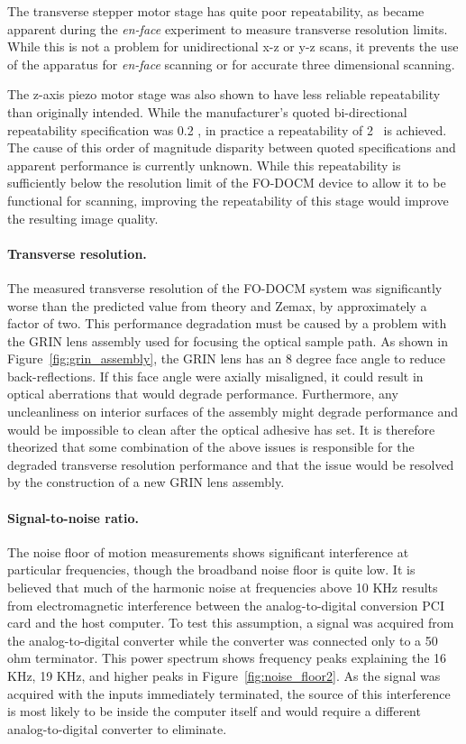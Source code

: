 The transverse stepper motor stage has quite poor repeatability, as became apparent during the {\em en-face} experiment to measure transverse resolution limits. While this is not a problem for unidirectional x-z or y-z scans, it prevents the use of the apparatus for {\em en-face} scanning or for accurate three dimensional scanning.

The z-axis piezo motor stage was also shown to have less reliable repeatability than originally intended. While the manufacturer's quoted bi-directional repeatability specification was 0.2 \micron, in practice a repeatability of 2 \micron~is achieved. The cause of this order of magnitude disparity between quoted specifications and apparent performance is currently unknown. While this repeatability is sufficiently below the resolution limit of the FO-DOCM device to allow it to be functional for scanning, improving the repeatability of this stage would improve the resulting image quality.

\paragraph{Transverse resolution.}

The measured transverse resolution of the FO-DOCM system was significantly worse than the predicted value from theory and Zemax, by approximately a factor of two. This performance degradation must be caused by a problem with the GRIN lens assembly used for focusing the optical sample path. As shown in Figure~\ref{fig:grin_assembly}, the GRIN lens has an 8 degree face angle to reduce back-reflections. If this face angle were axially misaligned, it could result in optical aberrations that would degrade performance. Furthermore, any uncleanliness on interior surfaces of the assembly might degrade performance and would be impossible to clean after the optical adhesive has set. It is therefore theorized that some combination of the above issues is responsible for the degraded transverse resolution performance and that the issue would be resolved by the construction of a new GRIN lens assembly.

\paragraph{Signal-to-noise ratio.}

The noise floor of motion measurements shows significant interference at particular frequencies, though the broadband noise floor is quite low. It is believed that much of the harmonic noise at frequencies above 10 KHz results from electromagnetic interference between the analog-to-digital conversion PCI card and the host computer. To test this assumption, a signal was acquired from the analog-to-digital converter while the converter was connected only to a 50 ohm terminator. This power spectrum shows frequency peaks explaining the 16 KHz, 19 KHz, and higher peaks in Figure~\ref{fig:noise_floor2}. As the signal was acquired with the inputs immediately terminated, the source of this interference is most likely to be inside the computer itself and would require a different analog-to-digital converter to eliminate. %

